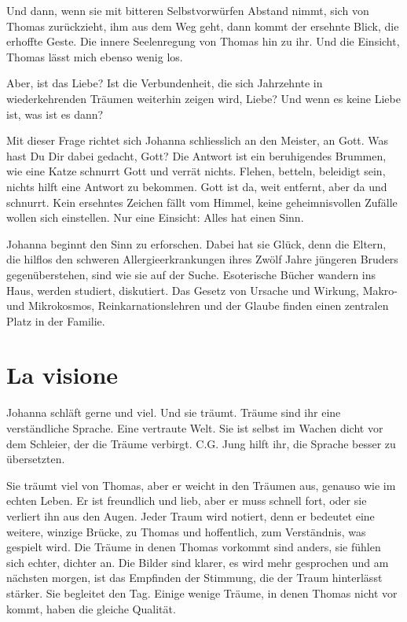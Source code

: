 \documentclass[10pt,titlepage,a5paper]{book}
\begin{document}
Und dann, wenn sie mit bitteren Selbstvorwürfen Abstand nimmt, sich von Thomas zurückzieht, ihm aus dem Weg geht, dann kommt der ersehnte Blick, die erhoffte Geste. Die innere Seelenregung von Thomas hin zu ihr. Und die Einsicht, Thomas lässt mich ebenso wenig los.

Aber, ist das Liebe? Ist die Verbundenheit, die sich Jahrzehnte in wiederkehrenden Träumen weiterhin zeigen wird, Liebe? Und wenn es keine Liebe ist, was ist es dann?

Mit dieser Frage richtet sich Johanna schliesslich an den Meister, an Gott. Was hast Du Dir dabei gedacht, Gott? Die Antwort ist ein beruhigendes Brummen, wie eine Katze schnurrt Gott und verrät nichts. Flehen, betteln, beleidigt sein, nichts hilft eine Antwort zu bekommen. Gott ist da, weit entfernt, aber da und schnurrt. Kein ersehntes Zeichen fällt vom Himmel, keine geheimnisvollen Zufälle wollen sich einstellen. Nur eine Einsicht: Alles hat einen Sinn.

Johanna beginnt den Sinn zu erforschen. Dabei hat sie Glück, denn die Eltern, die hilflos den schweren Allergieerkrankungen ihres Zwölf Jahre jüngeren Bruders gegenüberstehen, sind wie sie auf der Suche. Esoterische Bücher wandern ins Haus, werden studiert, diskutiert. Das Gesetz von Ursache und Wirkung, Makro- und Mikrokosmos, Reinkarnationslehren und der Glaube finden einen zentralen Platz in der Familie.



\section*{La visione}



Johanna schläft gerne und viel. Und sie träumt. Träume sind ihr eine verständliche Sprache. Eine vertraute Welt. Sie ist selbst im Wachen dicht vor dem Schleier, der die Träume verbirgt. C.G. Jung hilft ihr, die Sprache besser zu übersetzten.

Sie träumt viel von Thomas, aber er weicht in den Träumen aus, genauso wie im echten Leben. Er ist freundlich und lieb, aber er muss schnell fort, oder sie verliert ihn aus den Augen. Jeder Traum wird notiert, denn er bedeutet eine weitere, winzige Brücke, zu Thomas und hoffentlich, zum Verständnis, was gespielt wird. Die Träume in denen Thomas vorkommt sind anders, sie fühlen sich echter, dichter an. Die Bilder sind klarer, es wird mehr gesprochen und am nächsten morgen, ist das Empfinden der Stimmung, die der Traum hinterlässt stärker. Sie begleitet den Tag.
Einige wenige Träume, in denen Thomas nicht vor kommt, haben die gleiche Qualität.
\end{document}
